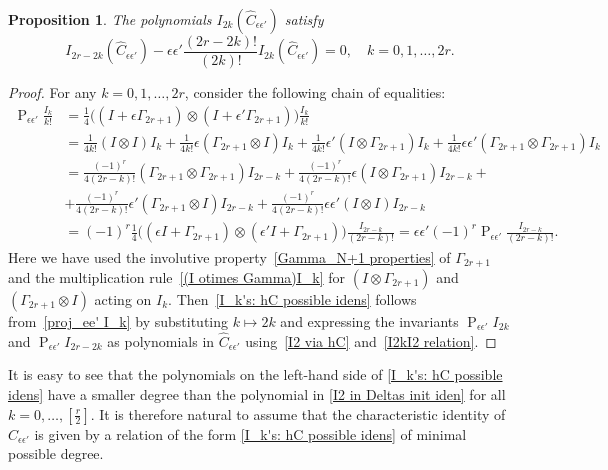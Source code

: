 \documentclass[a4paper]{article}
\newcommand{\hC}{\widehat{C}}
\renewcommand{\=}{\ =\ }
\DeclareMathOperator{\proj}{P}
\numberwithin{equation}{section}
\newtheorem{proposition}{Proposition}
\theoremstyle{remark}
\begin{document}
\begin{proposition}
The polynomials $I_{2k}(\hC_{\epsilon\epsilon'})$ satisfy
\begin{equation}\label{I_k's: hC possible idens}
I_{2r-2k}(\hC_{\epsilon\epsilon'})-\epsilon\epsilon' \frac{(2r-2k)!}{(2k)!}I_{2k}(\hC_{\epsilon\epsilon'})=0,\quad k=0,1,\dots,2r.
\end{equation}
\end{proposition}
\begin{proof}
For any $k=0,1,\dots,2r$, consider the following chain of equalities:
\begin{equation}\label{proj_ee' I_k}
\begin{aligned}
\proj_{\epsilon\epsilon'}\frac{I_k}{k!}&=\frac{1}{4}\big((I+\epsilon \Gamma_{{2r}+1})\otimes (I+\epsilon' \Gamma_{{2r}+1})\big)\frac{I_k}{k!}\\
&=\frac{1}{4k!}(I\otimes I)I_k+\frac{1}{4k!}\epsilon(\Gamma_{{2r}+1}\otimes I)I_k+\frac{1}{4k!}\epsilon'(I\otimes \Gamma_{{2r}+1})I_k+\frac{1}{4k!}\epsilon\epsilon'(\Gamma_{{2r}+1}\otimes \Gamma_{{2r}+1})I_k\\
&=\frac{(-1)^r}{4({2r}-k)!}(\Gamma_{{2r}+1}\otimes \Gamma_{{2r}+1})I_{{2r}-k}+\frac{(-1)^r}{4({2r}-k)!}\epsilon (I\otimes \Gamma_{{2r}+1})I_{{2r}-k}+\\
&+\frac{(-1)^r}{4({2r}-k)!}\epsilon'(\Gamma_{{2r}+1}\otimes I)I_{{2r}-k}+\frac{(-1)^r}{4({2r}-k)!}\epsilon\epsilon' (I\otimes I)I_{{2r}-k}\\
&=(-1)^r\frac{1}{4}\big((\epsilon I+\Gamma_{{2r}+1})\otimes (\epsilon' I+\Gamma_{{2r}+1})\big)\frac{I_{{2r}-k}}{({2r}-k)!}=\epsilon\epsilon' (-1)^r\proj_{\epsilon\epsilon'}\frac{I_{{2r}-k}}{({2r}-k)!}.
\end{aligned}
\end{equation}
Here we have used the involutive property~\eqref{Gamma_N+1 properties}
of $\Gamma_{2r+1}$ and the multiplication rule~\eqref{(I otimes Gamma)I_k}
for $(I\otimes \Gamma_{2r+1})$ and $(\Gamma_{2r+1}\otimes I)$ acting on $I_k$.
Then~\eqref{I_k's: hC possible idens} follows from~\eqref{proj_ee' I_k} by substituting $k\mapsto 2k$ and expressing the invariants
$\proj_{\epsilon\epsilon'} I_{2k}$ and $\proj_{\epsilon\epsilon'} I_{2r-2k}$
as polynomials in $\hC_{\epsilon\epsilon'}$
using~\eqref{I2 via hC} and~\eqref{I2kI2 relation}.
\end{proof}

It is easy to see that the polynomials on the left-hand side of
\eqref{I_k's: hC possible idens} have a smaller degree than the polynomial
in \eqref{I2 in Deltas init iden} for all $k=0,\dots,[\frac{r}{2}]$.
It is therefore natural to assume that the characteristic identity of
$\hC_{\epsilon\epsilon'}$ is given by a relation of the form
\eqref{I_k's: hC possible idens} of minimal possible degree.
\end{document}
